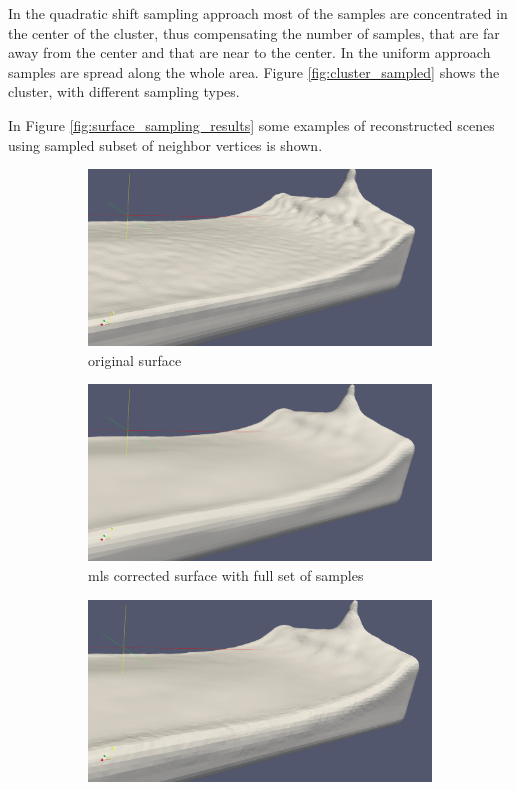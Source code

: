 In the quadratic shift sampling approach most of the samples are concentrated in the center of the cluster, thus compensating the number of samples, that are far away from the center and that are near to the center. In the uniform approach samples are spread along the whole area. Figure \ref{fig:cluster_sampled} shows the cluster, with different sampling types.

In Figure \ref{fig:surface_sampling_results} some examples of reconstructed scenes using sampled subset of neighbor vertices is shown.
\begin{figure}
	\begin{center}
		\begin{subfigure}[b]{\textwidth}
			\includegraphics[width=\textwidth]{figures/MLSSurfaceOriginal.png}
			\caption{original surface}
		\end{subfigure}
		\begin{subfigure}[b]{\textwidth}
			\includegraphics[width=\textwidth]{figures/MLSSurfaceSamplingFullSet.png}
			\caption{mls corrected surface with full set of samples}
		\end{subfigure}
		\begin{subfigure}[b]{\textwidth}
			\includegraphics[width=\textwidth]{figures/MLSSurfaceSamplingQuarterSet.png}

\end{subfigure}
\end{center}
\end{figure}
